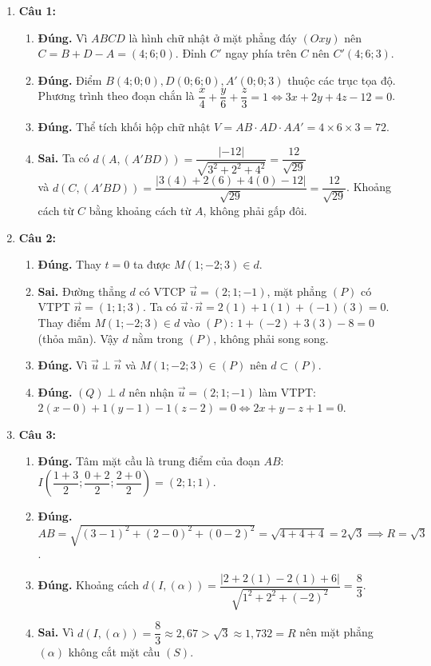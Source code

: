 \documentclass[12pt,a4paper]{article}
\begin{document}
\begin{enumerate}
\item \textbf{Câu 1:}
\begin{enumerate}[label=\alph*)]
    \item \textbf{Đúng.} Vì $ABCD$ là hình chữ nhật ở mặt phẳng đáy $(Oxy)$ nên $C = B + D - A = (4; 6; 0)$. Đỉnh $C'$ ngay phía trên $C$ nên $C'(4; 6; 3)$.
    \item \textbf{Đúng.} Điểm $B(4; 0; 0), D(0; 6; 0), A'(0; 0; 3)$ thuộc các trục tọa độ. Phương trình theo đoạn chắn là $\dfrac{x}{4} + \dfrac{y}{6} + \dfrac{z}{3} = 1 \iff 3x + 2y + 4z - 12 = 0$.
    \item \textbf{Đúng.} Thể tích khối hộp chữ nhật $V = AB \cdot AD \cdot AA' = 4 \times 6 \times 3 = 72$.
    \item \textbf{Sai.} Ta có $d(A, (A'BD)) = \dfrac{|-12|}{\sqrt{3^2 + 2^2 + 4^2}} = \dfrac{12}{\sqrt{29}}$\\
    và $d(C, (A'BD)) = \dfrac{|3(4) + 2(6) + 4(0) - 12|}{\sqrt{29}} = \dfrac{12}{\sqrt{29}}$. Khoảng cách từ $C$ bằng khoảng cách từ $A$, không phải gấp đôi.
\end{enumerate}

\item \textbf{Câu 2:}
\begin{enumerate}[label=\alph*)]
    \item \textbf{Đúng.} Thay $t = 0$ ta được $M(1; -2; 3) \in d$.
    \item \textbf{Sai.} Đường thẳng $d$ có VTCP $\vec{u} = (2; 1; -1)$, mặt phẳng $(P)$ có VTPT $\vec{n} = (1; 1; 3)$.  
    Ta có $\vec{u} \cdot \vec{n} = 2(1) + 1(1) + (-1)(3) = 0$. Thay điểm $M(1; -2; 3) \in d$ vào $(P)$: $1 + (-2) + 3(3) - 8 = 0$ (thỏa mãn). Vậy $d$ nằm trong $(P)$, không phải song song.
    \item \textbf{Đúng.} Vì $\vec{u} \perp \vec{n}$ và $M(1; -2; 3) \in (P)$ nên $d \subset (P)$.
    \item \textbf{Đúng.} $(Q) \perp d$ nên nhận $\vec{u} = (2; 1; -1)$ làm VTPT:  
    $2(x - 0) + 1(y - 1) - 1(z - 2) = 0 \iff 2x + y - z + 1 = 0$.
\end{enumerate}

\item \textbf{Câu 3:}
\begin{enumerate}[label=\alph*)]
    \item \textbf{Đúng.} Tâm mặt cầu là trung điểm của đoạn $AB$: $I\left(\dfrac{1+3}{2}; \dfrac{0+2}{2}; \dfrac{2+0}{2}\right) = (2; 1; 1)$.
    \item \textbf{Đúng.} $AB = \sqrt{(3-1)^2 + (2-0)^2 + (0-2)^2} = \sqrt{4 + 4 + 4} = 2\sqrt{3} \implies R = \sqrt{3}$.
    \item \textbf{Đúng.} Khoảng cách $d(I, (\alpha)) = \dfrac{|2 + 2(1) - 2(1) + 6|}{\sqrt{1^2 + 2^2 + (-2)^2}} = \dfrac{8}{3}$.
    \item \textbf{Sai.} Vì $d(I, (\alpha)) = \dfrac{8}{3} \approx 2{,}67 > \sqrt{3} \approx 1{,}732 = R$ nên mặt phẳng $(\alpha)$ không cắt mặt cầu $(S)$.
\end{enumerate}


\end{enumerate}
\end{document}
